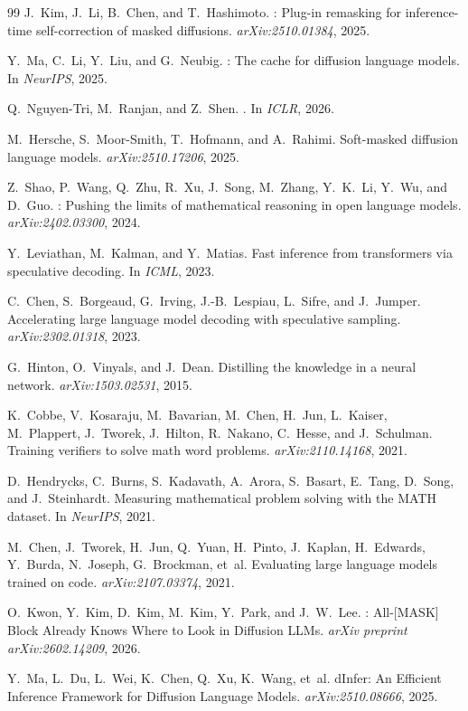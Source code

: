 \documentclass[11pt]{article}
\begin{document}
\begin{thebibliography}{99}
J.~Kim, J.~Li, B.~Chen, and T.~Hashimoto.
: Plug-in remasking for inference-time self-correction of masked diffusions.
\newblock \emph{arXiv:2510.01384}, 2025.

Y.~Ma, C.~Li, Y.~Liu, and G.~Neubig.
: The cache for diffusion language models.
\newblock In \emph{NeurIPS}, 2025.

Q.~Nguyen-Tri, M.~Ranjan, and Z.~Shen.
.
\newblock In \emph{ICLR}, 2026.

M.~Hersche, S.~Moor-Smith, T.~Hofmann, and A.~Rahimi.
\newblock Soft-masked diffusion language models.
\newblock \emph{arXiv:2510.17206}, 2025.

Z.~Shao, P.~Wang, Q.~Zhu, R.~Xu, J.~Song, M.~Zhang, Y.~K.~Li, Y.~Wu, and D.~Guo.
: Pushing the limits of mathematical reasoning in open language models.
\newblock \emph{arXiv:2402.03300}, 2024.

Y.~Leviathan, M.~Kalman, and Y.~Matias.
\newblock Fast inference from transformers via speculative decoding.
\newblock In \emph{ICML}, 2023.

C.~Chen, S.~Borgeaud, G.~Irving, J.-B.~Lespiau, L.~Sifre, and J.~Jumper.
\newblock Accelerating large language model decoding with speculative sampling.
\newblock \emph{arXiv:2302.01318}, 2023.

G.~Hinton, O.~Vinyals, and J.~Dean.
\newblock Distilling the knowledge in a neural network.
\newblock \emph{arXiv:1503.02531}, 2015.

K.~Cobbe, V.~Kosaraju, M.~Bavarian, M.~Chen, H.~Jun, L.~Kaiser, M.~Plappert, J.~Tworek, J.~Hilton, R.~Nakano, C.~Hesse, and J.~Schulman.
\newblock Training verifiers to solve math word problems.
\newblock \emph{arXiv:2110.14168}, 2021.

D.~Hendrycks, C.~Burns, S.~Kadavath, A.~Arora, S.~Basart, E.~Tang, D.~Song, and J.~Steinhardt.
\newblock Measuring mathematical problem solving with the {MATH} dataset.
\newblock In \emph{NeurIPS}, 2021.

M.~Chen, J.~Tworek, H.~Jun, Q.~Yuan, H.~Pinto, J.~Kaplan, H.~Edwards, Y.~Burda, N.~Joseph, G.~Brockman, et~al.
\newblock Evaluating large language models trained on code.
\newblock \emph{arXiv:2107.03374}, 2021.

O.~Kwon, Y.~Kim, D.~Kim, M.~Kim, Y.~Park, and J.~W.~Lee.
: {All-[MASK]} Block Already Knows Where to Look in Diffusion {LLM}s.
\newblock \emph{arXiv preprint arXiv:2602.14209}, 2026.

Y.~Ma, L.~Du, L.~Wei, K.~Chen, Q.~Xu, K.~Wang, et~al.
\newblock dInfer: An Efficient Inference Framework for Diffusion Language Models.
\newblock \emph{arXiv:2510.08666}, 2025.

\end{thebibliography}
\end{document}

